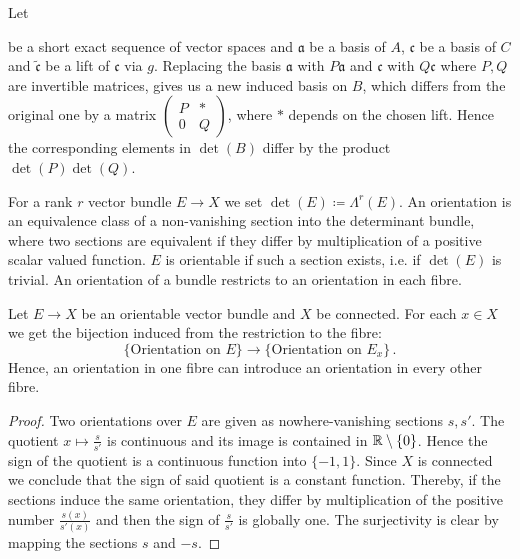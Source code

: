 \begin{remark}
	Let 
	\begin{center}
	\end{center}

be a short exact sequence of vector spaces and $\mathfrak{a}$ be a basis of $A$, $\mathfrak{c}$ be a basis of $C$ and $\tilde{\mathfrak{c}}$ be a lift of $\mathfrak{c}$ via $g$. Replacing the basis $\mathfrak{a}$ with $P\mathfrak{a}$ and $\mathfrak{c}$ with $Q\mathfrak{c}$ where $P,Q$ are invertible matrices, gives us a new induced basis on $B$, which differs from the original one by a matrix $\begin{pmatrix}
	P&*\\
	0&Q
\end{pmatrix}$, where $*$ depends on the chosen lift. Hence the corresponding elements in $\det(B)$ differ by the product $\det(P)\det(Q)$. 
\end{remark}
\begin{definition}\label{def:orient-orientedVectorBundle}
	For a rank $r$ vector bundle $E\to X$ we set $\det(E)\coloneq \Lambda^r(E)$. An orientation is an equivalence class of a non-vanishing section into the determinant bundle, where two sections are equivalent if they differ by multiplication of a positive scalar valued function. $E$ is orientable if such a section exists, i.e. if $\det(E)$ is trivial. An orientation of a bundle restricts to an orientation in each fibre.
\end{definition}

\begin{lemma}\label{lem:morse-OrientationsInAPointInduceOrientationsOfBundle}
	Let $E\to X$ be an orientable vector bundle and $X$ be connected. For each $x\in X$ we get the bijection induced from the restriction to the fibre:
	\begin{equation*}
		\{\text{Orientation on }E\} \to \{\text{Orientation on } E_x\}\,.
	\end{equation*} Hence, an orientation in one fibre can introduce an orientation in every other fibre.
\end{lemma}
\begin{proof}
	Two orientations over $E$ are given as nowhere-vanishing sections $s,s'$. The quotient $x\mapsto \frac{s}{s'}$ is continuous and its image is contained in $\mathbb{R}\setminus \{0\}$. Hence the sign of the quotient is a continuous function into $\{-1,1\}$. Since $X$ is connected we conclude that the sign of said quotient is a constant function. Thereby, if the sections induce the same orientation, they differ by multiplication of the positive number $\frac{s(x)}{s'(x)}$ and then the sign of $\frac{s}{s'}$ is globally one. The surjectivity is clear by mapping the sections $s$ and $-s$.
\end{proof}

